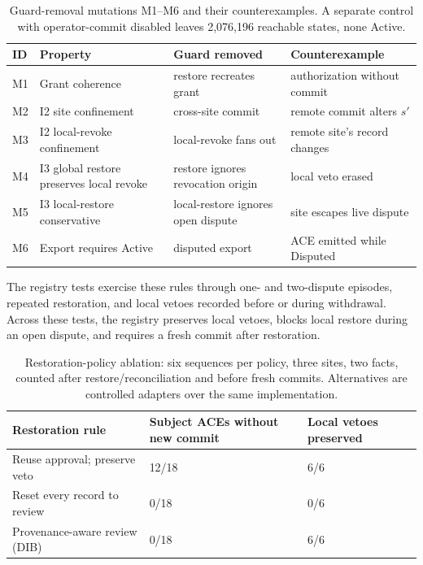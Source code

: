 \documentclass[journal]{IEEEtran}
\theoremstyle{definition}
\begin{document}
\begin{table}[t]
\centering
\caption{Guard-removal mutations M1--M6 and their counterexamples. A separate control with operator-commit disabled leaves 2,076,196 reachable states, none Active.}
\label{tab:tla}
\scriptsize
\begin{tabular}{@{}p{0.35cm}p{2.05cm}p{1.85cm}p{1.95cm}@{}}
\toprule
ID & Property & Guard removed & Counterexample \\
\midrule
M1 & Grant coherence & restore recreates grant & authorization without commit \\
M2 & I2 site confinement & cross-site commit & remote commit alters $s'$ \\
M3 & I2 local-revoke confinement & local-revoke fans out & remote site's record changes \\
M4 & I3 global restore preserves local revoke & restore ignores revocation origin & local veto erased \\
M5 & I3 local-restore conservative & local-restore ignores open dispute & site escapes live dispute \\
M6 & Export requires Active & disputed export & ACE emitted while Disputed \\
\bottomrule
\end{tabular}
\end{table}

The registry tests exercise these rules through one- and two-dispute episodes, repeated restoration, and local vetoes recorded before or during withdrawal. Across these tests, the registry preserves local vetoes, blocks local restore during an open dispute, and requires a fresh commit after restoration.

\begin{table}[t]
\centering
\caption{Restoration-policy ablation: six sequences per policy, three sites, two facts, counted after restore/reconciliation and before fresh commits. Alternatives are controlled adapters over the same implementation.}
\label{tab:comparison}
\scriptsize
\begin{tabular}{@{}p{3.0cm}p{1.9cm}p{1.9cm}@{}}
\toprule
Restoration rule & Subject ACEs without new commit & Local vetoes preserved \\
\midrule
Reuse approval; preserve veto & 12/18 & 6/6 \\
Reset every record to review & 0/18 & 0/6 \\
Provenance-aware review (DIB) & 0/18 & 6/6 \\
\bottomrule
\end{tabular}
\end{table}
\end{document}

